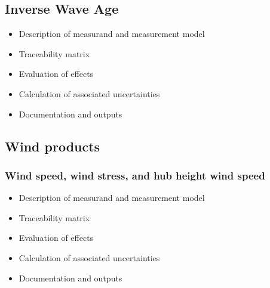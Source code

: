 \documentclass[a4paper,10pt,english]{sphinxmanual}
\begin{document}
\subsection{Inverse Wave Age}
\label{\detokenize{04_uncertainty_analysis:inverse-wave-age}}\begin{itemize}
\item {} 
\sphinxAtStartPar
Description of measurand and measurement model

\item {} 
\sphinxAtStartPar
Traceability matrix

\item {} 
\sphinxAtStartPar
Evaluation of effects

\item {} 
\sphinxAtStartPar
Calculation of associated uncertainties

\item {} 
\sphinxAtStartPar
Documentation and outputs

\end{itemize}


\subsection{Wind products}
\label{\detokenize{04_uncertainty_analysis:wind-products}}

\subsubsection{Wind speed, wind stress, and hub height wind speed}
\label{\detokenize{04_uncertainty_analysis:wind-speed-wind-stress-and-hub-height-wind-speed}}\begin{itemize}
\item {} 
\sphinxAtStartPar
Description of measurand and measurement model

\item {} 
\sphinxAtStartPar
Traceability matrix

\item {} 
\sphinxAtStartPar
Evaluation of effects

\item {} 
\sphinxAtStartPar
Calculation of associated uncertainties

\item {} 
\sphinxAtStartPar
Documentation and outputs

\end{itemize}
\end{document}
